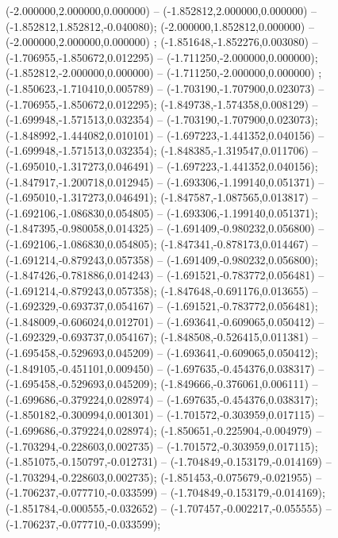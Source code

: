  (-2.000000,2.000000,0.000000) -- (-1.852812,2.000000,0.000000) -- (-1.852812,1.852812,-0.040080);
 (-2.000000,1.852812,0.000000) -- (-2.000000,2.000000,0.000000) ;
 (-1.851648,-1.852276,0.003080) -- (-1.706955,-1.850672,0.012295) -- (-1.711250,-2.000000,0.000000);
 (-1.852812,-2.000000,0.000000) -- (-1.711250,-2.000000,0.000000) ;
 (-1.850623,-1.710410,0.005789) -- (-1.703190,-1.707900,0.023073) -- (-1.706955,-1.850672,0.012295);
 (-1.849738,-1.574358,0.008129) -- (-1.699948,-1.571513,0.032354) -- (-1.703190,-1.707900,0.023073);
 (-1.848992,-1.444082,0.010101) -- (-1.697223,-1.441352,0.040156) -- (-1.699948,-1.571513,0.032354);
 (-1.848385,-1.319547,0.011706) -- (-1.695010,-1.317273,0.046491) -- (-1.697223,-1.441352,0.040156);
 (-1.847917,-1.200718,0.012945) -- (-1.693306,-1.199140,0.051371) -- (-1.695010,-1.317273,0.046491);
 (-1.847587,-1.087565,0.013817) -- (-1.692106,-1.086830,0.054805) -- (-1.693306,-1.199140,0.051371);
 (-1.847395,-0.980058,0.014325) -- (-1.691409,-0.980232,0.056800) -- (-1.692106,-1.086830,0.054805);
 (-1.847341,-0.878173,0.014467) -- (-1.691214,-0.879243,0.057358) -- (-1.691409,-0.980232,0.056800);
 (-1.847426,-0.781886,0.014243) -- (-1.691521,-0.783772,0.056481) -- (-1.691214,-0.879243,0.057358);
 (-1.847648,-0.691176,0.013655) -- (-1.692329,-0.693737,0.054167) -- (-1.691521,-0.783772,0.056481);
 (-1.848009,-0.606024,0.012701) -- (-1.693641,-0.609065,0.050412) -- (-1.692329,-0.693737,0.054167);
 (-1.848508,-0.526415,0.011381) -- (-1.695458,-0.529693,0.045209) -- (-1.693641,-0.609065,0.050412);
 (-1.849105,-0.451101,0.009450) -- (-1.697635,-0.454376,0.038317) -- (-1.695458,-0.529693,0.045209);
 (-1.849666,-0.376061,0.006111) -- (-1.699686,-0.379224,0.028974) -- (-1.697635,-0.454376,0.038317);
 (-1.850182,-0.300994,0.001301) -- (-1.701572,-0.303959,0.017115) -- (-1.699686,-0.379224,0.028974);
 (-1.850651,-0.225904,-0.004979) -- (-1.703294,-0.228603,0.002735) -- (-1.701572,-0.303959,0.017115);
 (-1.851075,-0.150797,-0.012731) -- (-1.704849,-0.153179,-0.014169) -- (-1.703294,-0.228603,0.002735);
 (-1.851453,-0.075679,-0.021955) -- (-1.706237,-0.077710,-0.033599) -- (-1.704849,-0.153179,-0.014169);
 (-1.851784,-0.000555,-0.032652) -- (-1.707457,-0.002217,-0.055555) -- (-1.706237,-0.077710,-0.033599);
